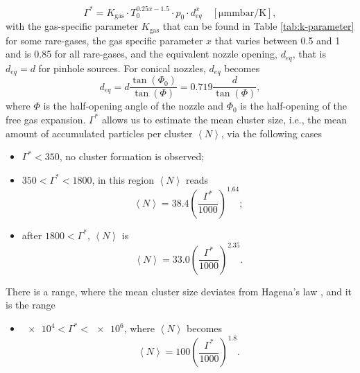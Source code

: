 \begin{equation}
\Gamma^{*} = K_{\text{gas}} \cdot T_{0}^{0.25x-1.5} \cdot p_{0} \cdot d_{eq}^{x}\quad \left[\si{\micro\meter\milli\bar\per\kelvin}\right],
\label{eq:Hagena-parameter}
\end{equation}
with the gas-specific parameter $K_{\text{gas}}$ that can be found in Table \ref{tab:k-parameter} for some rare-gases, the gas specific parameter $x$ that varies between 0.5 and 1 and is 0.85 for all rare-gases, and the equivalent nozzle opening, $d_{eq}$, that is $d_{eq}=d$ for pinhole sources. For conical nozzles, $d_{eq}$ becomes \citep{Schorb-2012-Thesis}
\begin{equation}
d_{eq} = d\frac{\tan\left(\Phi_{0}\right)}{\tan\left(\Phi\right)} = 0.719 \frac{d}{\tan\left(\Phi\right)},
\label{eq:equivalent-nozzle-opening}
\end{equation}
where $\Phi$ is the half-opening angle of the nozzle and $\Phi_{0}$ is the half-opening of the free gas expansion. $\Gamma^{*}$ allows us to estimate the mean cluster size, i.e., the mean amount of accumulated particles per cluster $\left\langle N\right\rangle$, via the following cases
\begin{itemize}
	\item $\Gamma^{*} < 350$, no cluster formation is observed;
	\item $350 < \Gamma^{*} < 1800$, in this region $\left\langle N\right\rangle$ reads \citep{Buck-1996-JChemPhys}
		\begin{equation}
		\left\langle N\right\rangle = 38.4 \left(\frac{\Gamma^{*}}{1000}\right)^{1.64};
		\label{eq:intermediate-hagena-scaling}
		\end{equation}
	\item after $1800 < \Gamma^{*}$, $\left\langle N\right\rangle$ is
		\begin{equation}
		\left\langle N\right\rangle = 33.0 \left(\frac{\Gamma^{*}}{1000}\right)^{2.35}.
		\label{eq:large-hagena-scaling}
		\end{equation}
\end{itemize}
There is a range, where the mean cluster size deviates from Hagena's law \citep{Dorchies-2003-PRA}, and it is the range
\begin{itemize}
	\item $\num{e4} < \Gamma^{*} < \num{e6}$, where $\left\langle N\right\rangle$ becomes
		\begin{equation}
		\left\langle N\right\rangle = 100 \left(\frac{\Gamma^{*}}{1000}\right)^{1.8}.
		\label{eq:dorchies-scaling}
		\end{equation}
\end{itemize}
